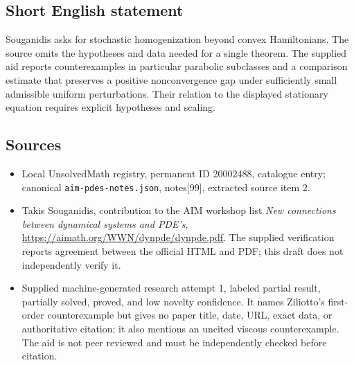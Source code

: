 \documentclass[11pt]{article}
\begin{document}
\subsection{Short English statement}
Souganidis asks for stochastic homogenization beyond convex Hamiltonians. The source omits the hypotheses and data needed for a single theorem. The supplied aid reports counterexamples in particular parabolic subclasses and a comparison estimate that preserves a positive nonconvergence gap under sufficiently small admissible uniform perturbations. Their relation to the displayed stationary equation requires explicit hypotheses and scaling.
\subsection{Sources}
\begin{itemize}
\item Local UnsolvedMath registry, permanent ID 20002488, catalogue entry; canonical \texttt{aim-pdes-notes.json}, notes[99], extracted source item 2.
\item Takis Souganidis, contribution to the AIM workshop list \emph{New connections between dynamical systems and PDE's}, \url{https://aimath.org/WWN/dynpde/dynpde.pdf}. The supplied verification reports agreement between the official HTML and PDF; this draft does not independently verify it.
\item Supplied machine-generated research attempt 1, labeled partial result, partially solved, proved, and low novelty confidence. It names Ziliotto's first-order counterexample but gives no paper title, date, URL, exact data, or authoritative citation; it also mentions an uncited viscous counterexample. The aid is not peer reviewed and must be independently checked before citation.
\end{itemize}
\end{document}
